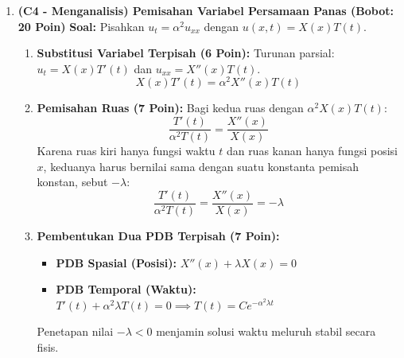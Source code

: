 \documentclass[11pt,a4paper]{article}
\begin{document}
\begin{enumerate}[label=\textbf{Soal \arabic*.}]
    \item \textbf{(C4 - Menganalisis) Pemisahan Variabel Persamaan Panas (Bobot: 20 Poin)}
    \textbf{Soal:} Pisahkan $u_t = \alpha^2 u_{xx}$ dengan $u(x,t) = X(x)T(t)$.
    \begin{tcolorbox}[colback=green!5!white,colframe=green!60!black,title=Solusi Model:]
    \begin{enumerate}
        \item \textbf{Substitusi Variabel Terpisah (6 Poin):}
        Turunan parsial: $u_t = X(x) T'(t)$ dan $u_{xx} = X''(x) T(t)$.
        $$ X(x) T'(t) = \alpha^2 X''(x) T(t) $$
        \item \textbf{Pemisahan Ruas (7 Poin):}
        Bagi kedua ruas dengan $\alpha^2 X(x) T(t)$:
        $$ \frac{T'(t)}{\alpha^2 T(t)} = \frac{X''(x)}{X(x)} $$
        Karena ruas kiri hanya fungsi waktu $t$ dan ruas kanan hanya fungsi posisi $x$, keduanya harus bernilai sama dengan suatu konstanta pemisah konstan, sebut $-\lambda$:
        $$ \frac{T'(t)}{\alpha^2 T(t)} = \frac{X''(x)}{X(x)} = -\lambda $$
        \item \textbf{Pembentukan Dua PDB Terpisah (7 Poin):}
        \begin{itemize}
            \item \textbf{PDB Spasial (Posisi):} $X''(x) + \lambda X(x) = 0$
            \item \textbf{PDB Temporal (Waktu):} $T'(t) + \alpha^2 \lambda T(t) = 0 \implies T(t) = C e^{-\alpha^2 \lambda t}$
        \end{itemize}
        Penetapan nilai $-\lambda < 0$ menjamin solusi waktu meluruh stabil secara fisis.
    \end{enumerate}
    \end{tcolorbox}


\end{enumerate}
\end{document}
